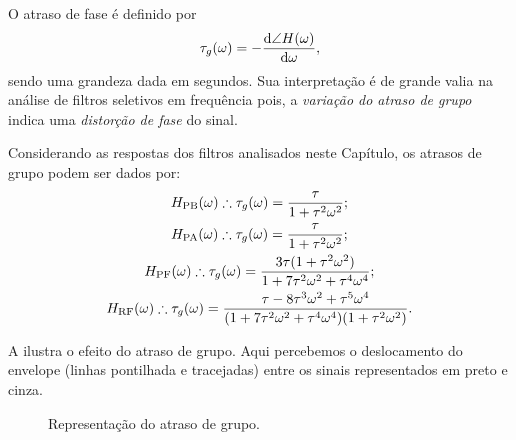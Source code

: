 O atraso de fase é definido por
\begin{equation}
	\tau_g(\omega)=-\frac{\mathrm{d}\angle H(\omega)}{\mathrm{d}\omega},
\end{equation}
sendo uma grandeza dada em segundos. Sua interpretação é de grande valia na análise de filtros seletivos em frequência pois, a \emph{variação do atraso de grupo} indica uma \emph{distorção de fase} do sinal.

Considerando as respostas dos filtros analisados neste Capítulo, os atrasos de grupo podem ser dados por:
\begin{gather}
	H_{\text{PB}}(\omega)\therefore\tau_g(\omega)=\frac{\tau}{1+\tau^2\omega^2};\\
	H_{\text{PA}}(\omega)\therefore\tau_g(\omega)=\frac{\tau}{1+\tau^2\omega^2};\\
	H_{\text{PF}}(\omega)\therefore\tau_g(\omega)=\frac{3\tau(1+\tau^2\omega^2)}{1+7\tau^2\omega^2+\tau^4\omega^4};\\
	H_{\text{RF}}(\omega)\therefore\tau_g(\omega)=\frac{\tau-8\tau^3\omega^2+\tau^5\omega^4}{(1+7\tau^2\omega^2+\tau^4\omega^4)(1+\tau^2\omega^2)}.\raisetag{-1em}
\end{gather}

A  ilustra o efeito do atraso de grupo. Aqui percebemos o deslocamento do envelope (linhas pontilhada e tracejadas) entre os sinais representados em preto e cinza.

\begin{figure}[ht]
	\centering
	\caption{Representação do atraso de grupo.}
	\label{fig:taug}
\end{figure}

